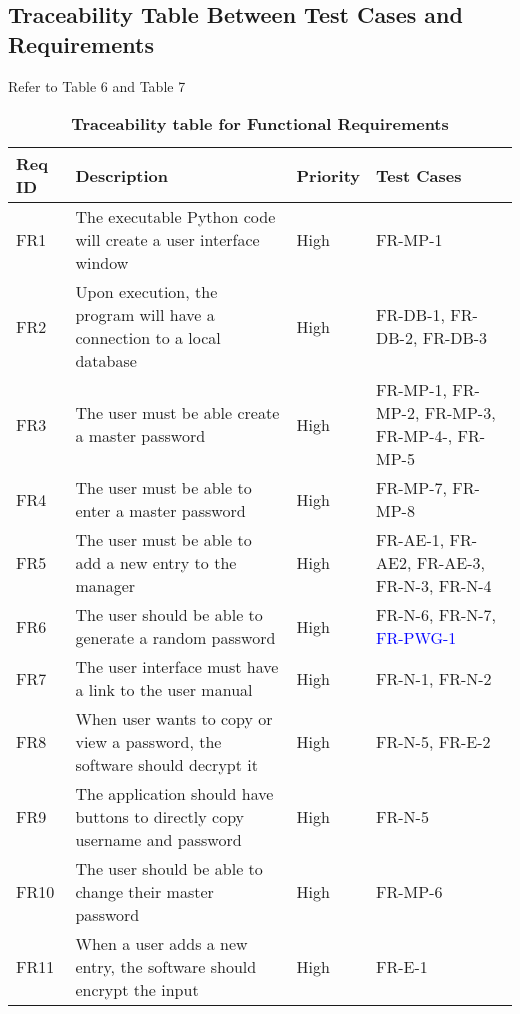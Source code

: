 \documentclass[12pt, titlepage]{article}
\begin{document}
\subsection{Traceability Table Between Test Cases and Requirements}
Refer to Table 6 and Table 7
\begin{table}[!htbp]
    \caption{\textbf{Traceability table for Functional Requirements}} \label{4Table}
    \begin{tabularx}{\textwidth}{p{2cm}Xp{2cm}X}
        \toprule
        \textbf{Req ID} & \textbf{Description} & \textbf{Priority} & \textbf{Test Cases}\\
        \midrule
        FR1  & The executable Python code will create a user interface window & High & FR-MP-1\\\hline
        FR2  & Upon execution, the program will have a connection to a local database & High & FR-DB-1, FR-DB-2, FR-DB-3\\\hline
        FR3  & The user must be able create a master password & High & FR-MP-1, FR-MP-2, FR-MP-3, FR-MP-4-, FR-MP-5\\\hline
        FR4  & The user must be able to enter a master password & High & FR-MP-7, FR-MP-8\\\hline
        FR5  & The user must be able to add a new entry to the manager & High & FR-AE-1, FR-AE2, FR-AE-3, FR-N-3, FR-N-4\\\hline
        FR6  & The user should be able to generate a random password  & High & FR-N-6, FR-N-7, \textcolor{blue}{FR-PWG-1}\\\hline
        FR7  & The user interface must have a link to the user manual & High & FR-N-1, FR-N-2\\\hline
        FR8  & When user wants to copy or view a password, the software should decrypt it & High & FR-N-5, FR-E-2\\\hline
        FR9  & The application should have buttons to directly copy username and password & High & FR-N-5\\\hline
        FR10 & The user should be able to change their master password  & High & FR-MP-6\\\hline
        FR11 & When a user adds a new entry, the software should encrypt the input & High & FR-E-1\\
    
        \bottomrule
    \end{tabularx}
\end{table}
\end{document}
